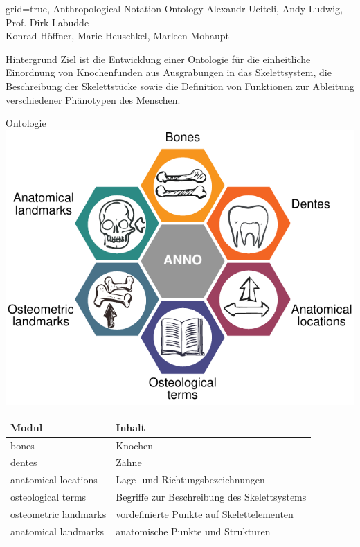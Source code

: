 \documentclass[portrait,final,a0paper,fontscale=0.320]{imiseposter}
\begin{document}
\begin{poster}%
  {grid=true,}
  {}
  {Anthropological Notation Ontology}
  {Alexandr Uciteli, Andy Ludwig, Prof. Dirk Labudde\\Konrad Höffner, Marie Heuschkel, Marleen Mohaupt}
  {%
  }

\begin{posterbox}[name=background,column=0,row=0]{Hintergrund}
Ziel ist die Entwicklung einer Ontologie für die einheitliche Einordnung von Knochenfunden aus Ausgrabungen in das Skelettsystem, die Beschreibung der Skelettstücke sowie die Definition von Funktionen zur Ableitung verschiedener Phänotypen des Menschen. 
\end{posterbox}
\begin{posterbox}[name=ontology,below=background]{Ontologie}
\includegraphics[width=\textwidth]{img/anno.pdf}
\begin{tabular}{ll}
\toprule
\textbf{Modul}			&\textbf{Inhalt}\\
\midrule
bones					&Knochen\\
dentes					&Zähne\\
anatomical locations	&Lage- und Richtungsbezeichnungen\\
osteological terms		&Begriffe zur Beschreibung des Skelettsystems\\
osteometric landmarks	&vordefinierte Punkte auf Skelettelementen\\
anatomical landmarks	&anatomische Punkte und Strukturen\\
\bottomrule
\end{tabular}


\end{posterbox}
\end{poster}
\end{document}
